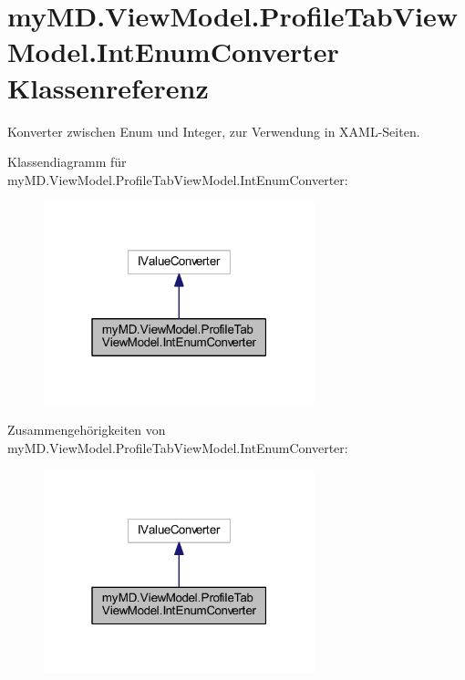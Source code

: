 \hypertarget{classmy_m_d_1_1_view_model_1_1_profile_tab_view_model_1_1_int_enum_converter}{}\section{my\+M\+D.\+View\+Model.\+Profile\+Tab\+View\+Model.\+Int\+Enum\+Converter Klassenreferenz}
\label{classmy_m_d_1_1_view_model_1_1_profile_tab_view_model_1_1_int_enum_converter}


Konverter zwischen Enum und Integer, zur Verwendung in X\+A\+M\+L-\/\+Seiten.  




Klassendiagramm für my\+M\+D.\+View\+Model.\+Profile\+Tab\+View\+Model.\+Int\+Enum\+Converter\+:
\nopagebreak
\begin{figure}[H]
\begin{center}
\leavevmode
\includegraphics[width=223pt]{classmy_m_d_1_1_view_model_1_1_profile_tab_view_model_1_1_int_enum_converter__inherit__graph}
\end{center}
\end{figure}


Zusammengehörigkeiten von my\+M\+D.\+View\+Model.\+Profile\+Tab\+View\+Model.\+Int\+Enum\+Converter\+:
\nopagebreak
\begin{figure}[H]
\begin{center}
\leavevmode
\includegraphics[width=223pt]{classmy_m_d_1_1_view_model_1_1_profile_tab_view_model_1_1_int_enum_converter__coll__graph}
\end{center}
\end{figure}
